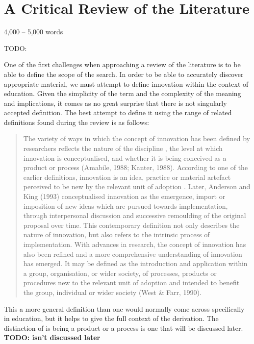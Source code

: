 \section{A Critical Review of the Literature}
4,000 – 5,000 words

TODO: \cite{Cordingley2007}

One of the first challenges when approaching a review of the literature is to be able to define the scope of the search. In order to be able to accurately discover appropriate material, we must attempt to define innovation within the context of education. Given the simplicity of the term and the complexity of the meaning and implications, it comes as no great surprise that there is not singularly accepted definition. The best attempt to define it using the range of related definitions found during the review is as follows:

\begin{quote}
The variety of ways in which the concept of innovation has been defined by researchers reflects the nature of the discipline \cite{Gopalakrishnan_1994}, the level at which innovation is conceptualised, and whether it is being conceived as a product or process (Amabile, 1988; Kanter, 1988). According to one of the earlier definitions, innovation is an idea, practice or material artefact perceived to be new by the relevant unit of adoption \cite{Allen_1975}. Later, Anderson and King (1993) conceptualised innovation as the emergence, import or imposition of new ideas which are pursued towards implementation, through interpersonal discussion and successive remoulding of the original proposal over time. This contemporary definition not only describes the nature of innovation, but also refers to the intrinsic process of implementation. With advances in research, the concept of innovation has also been refined and a more comprehensive understanding of innovation has emerged. It may be defined as the introduction and application within a group, organisation, or wider society, of processes, products or procedures new to the relevant unit of adoption and intended to benefit the group, individual or wider society (West & Farr, 1990).
\end{quote}  \cite{Sharma_2005}

This a more general definition than one would normally come across specifically in education, but it helps to give the full context of the derivation. The distinction of is being a product or a process is one that will be discussed later. \textbf{TODO: isn't discussed later}


